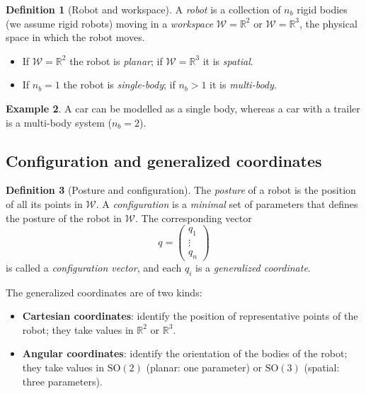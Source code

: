 \documentclass[11pt,a4paper]{article}
\newcommand{\R}{\mathbb{R}}
\newcommand{\W}{\mathcal{W}}
\newcommand{\SO}{\mathrm{SO}}
\theoremstyle{definition}
\newtheorem{definition}{Definition}[section]
\newtheorem{example}[definition]{Example}
\theoremstyle{plain}
\theoremstyle{remark}
\begin{document}
\begin{definition}[Robot and workspace]
A \emph{robot} is a collection of $n_b$ rigid bodies (we assume rigid robots) moving in a \emph{workspace} $\W=\R^2$ or $\W=\R^3$, the physical space in which the robot moves.
\begin{itemize}[nosep]
  \item If $\W=\R^2$ the robot is \emph{planar}; if $\W=\R^3$ it is \emph{spatial}.
  \item If $n_b=1$ the robot is \emph{single-body}; if $n_b>1$ it is \emph{multi-body}.
\end{itemize}
\end{definition}

\begin{example}
A car can be modelled as a single body, whereas a car with a trailer is a multi-body system ($n_b=2$).
\end{example}

\subsection{Configuration and generalized coordinates}

\begin{definition}[Posture and configuration]
The \emph{posture} of a robot is the position of all its points in $\W$. A \emph{configuration} is a \emph{minimal} set of parameters that defines the posture of the robot in $\W$. The corresponding vector
\[
  q=\begin{pmatrix} q_1\\ \vdots\\ q_n\end{pmatrix}
\]
is called a \emph{configuration vector}, and each $q_i$ is a \emph{generalized coordinate}.
\end{definition}

The generalized coordinates are of two kinds:
\begin{itemize}[nosep]
  \item \textbf{Cartesian coordinates}: identify the position of representative points of the robot; they take values in $\R^2$ or $\R^3$.
  \item \textbf{Angular coordinates}: identify the orientation of the bodies of the robot; they take values in $\SO(2)$ (planar: one parameter) or $\SO(3)$ (spatial: three parameters).
\end{itemize}
\end{document}
